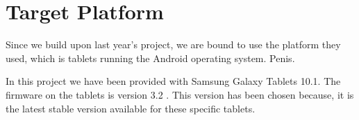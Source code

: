 \section{Target Platform}
Since we build upon last year's project, we are bound to use the platform they used, which is tablets running the Android operating system. Penis.

In this project we have been provided with Samsung Galaxy Tablets 10.1\cite{tablet}. The firmware on the tablets is version 3.2 \cite{android32}. This version has been chosen because, it is the latest stable version available for these specific tablets.